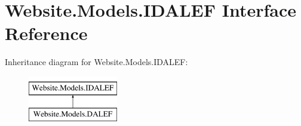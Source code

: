 \hypertarget{interface_website_1_1_models_1_1_i_d_a_l_e_f}{}\section{Website.\+Models.\+I\+D\+A\+L\+E\+F Interface Reference}
\label{interface_website_1_1_models_1_1_i_d_a_l_e_f}
Inheritance diagram for Website.\+Models.\+I\+D\+A\+L\+E\+F\+:\begin{figure}[H]
\begin{center}
\leavevmode
\includegraphics[height=2.000000cm]{interface_website_1_1_models_1_1_i_d_a_l_e_f}
\end{center}
\end{figure}
